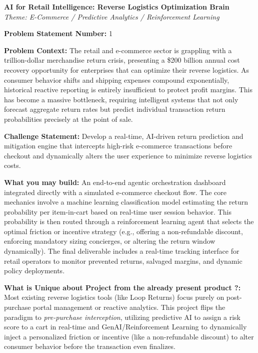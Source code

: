 \documentclass[11pt, a4paper]{article}
\begin{document}
\begin{center}
    \Large\textbf{AI for Retail Intelligence: Reverse Logistics Optimization Brain} \\
    \normalsize\textit{Theme: E-Commerce / Predictive Analytics / Reinforcement Learning}
\end{center}
\vspace{0.8cm}

\noindent\textbf{Problem Statement Number:} 1

\vspace{0.4cm}
\noindent\textbf{Problem Context:} The retail and e-commerce sector is grappling with a trillion-dollar merchandise return crisis, presenting a \$200 billion annual cost recovery opportunity for enterprises that can optimize their reverse logistics. As consumer behavior shifts and shipping expenses compound exponentially, historical reactive reporting is entirely insufficient to protect profit margins. This has become a massive bottleneck, requiring intelligent systems that not only forecast aggregate return rates but predict individual transaction return probabilities precisely at the point of sale.

\vspace{0.4cm}
\noindent\textbf{Challenge Statement:} Develop a real-time, AI-driven return prediction and mitigation engine that intercepts high-risk e-commerce transactions before checkout and dynamically alters the user experience to minimize reverse logistics costs.

\vspace{0.4cm}
\noindent\textbf{What you may build:} An end-to-end agentic orchestration dashboard integrated directly with a simulated e-commerce checkout flow. The core mechanics involve a machine learning classification model estimating the return probability per item-in-cart based on real-time user session behavior. This probability is then routed through a reinforcement learning agent that selects the optimal friction or incentive strategy (e.g., offering a non-refundable discount, enforcing mandatory sizing concierges, or altering the return window dynamically). The final deliverable includes a real-time tracking interface for retail operators to monitor prevented returns, salvaged margins, and dynamic policy deployments.

\vspace{0.4cm}
\noindent\textbf{What is Unique about Project from the already present product ?:} Most existing reverse logistics tools (like Loop Returns) focus purely on post-purchase portal management or reactive analytics. This project flips the paradigm to \textit{pre-purchase interception}, utilizing predictive AI to assign a risk score to a cart in real-time and GenAI/Reinforcement Learning to dynamically inject a personalized friction or incentive (like a non-refundable discount) to alter consumer behavior before the transaction even finalizes.
\end{document}
